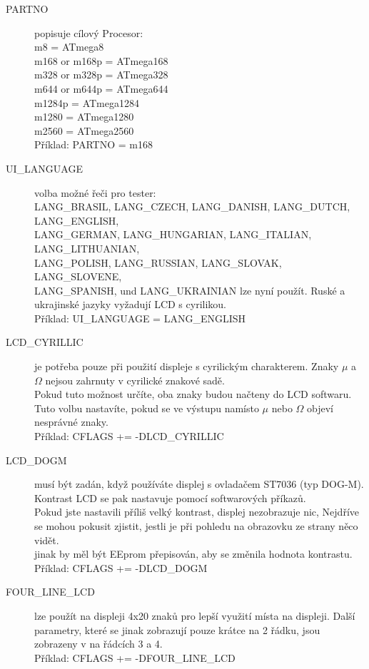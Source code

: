\begin{description}
\vspace{-0,3 cm}
  \item[PARTNO] popisuje cílový Procesor:\\
         m8 = ATmega8\\
         m168 or m168p = ATmega168\\
         m328 or m328p = ATmega328\\
         m644 or m644p = ATmega644\\
         m1284p        = ATmega1284\\
         m1280         = ATmega1280\\
         m2560         = ATmega2560\\
    Příklad: PARTNO = m168
\vspace{-0,3 cm}
  \item[UI\_LANGUAGE] volba možné řeči pro tester:\\
    LANG\_BRASIL, LANG\_CZECH, LANG\_DANISH, LANG\_DUTCH, LANG\_ENGLISH, \\
    LANG\_GERMAN, LANG\_HUNGARIAN, LANG\_ITALIAN, LANG\_LITHUANIAN, \\
    LANG\_POLISH, LANG\_RUSSIAN, LANG\_SLOVAK, LANG\_SLOVENE, \\
    LANG\_SPANISH, und LANG\_UKRAINIAN lze nyní použít.
 Ruské a ukrajinské jazyky vyžadují LCD s cyrilikou.\\
    Příklad: UI\_LANGUAGE = LANG\_ENGLISH
\vspace{-0,3 cm}
  \item[LCD\_CYRILLIC] je potřeba pouze při použití displeje s cyrilickým charakterem.
Znaky \(\mu\) a \(\Omega\) nejsou zahrnuty v cyrilické znakové sadě.\\
Pokud tuto možnost určíte, oba znaky budou načteny do LCD softwaru.\\
Tuto volbu nastavíte, pokud se ve výstupu namísto \(\mu\) nebo \(\Omega\) objeví nesprávné znaky. \\
Příklad: CFLAGS += -DLCD\_CYRILLIC
\vspace{-0,3 cm}
  \item[LCD\_DOGM] musí být zadán, když používáte displej s ovladačem ST7036 (typ DOG-M).
Kontrast LCD se pak nastavuje pomocí softwarových příkazů.\\
Pokud jste nastavili příliš velký kontrast, displej nezobrazuje nic,
Nejdříve se mohou pokusit zjistit, jestli je při pohledu na obrazovku ze strany něco vidět.\\
jinak by měl být EEprom přepisován, aby se změnila hodnota kontrastu.\\
Příklad: CFLAGS += -DLCD\_DOGM
\vspace{-0,3 cm}
  \item[FOUR\_LINE\_LCD] lze použít na displeji 4x20 znaků pro lepší využití místa na displeji. Další parametry, které se jinak zobrazují pouze krátce na 2 řádku, jsou zobrazeny v
na řádcích 3 a 4. \\
Příklad: CFLAGS += -DFOUR\_LINE\_LCD


\end{description}
